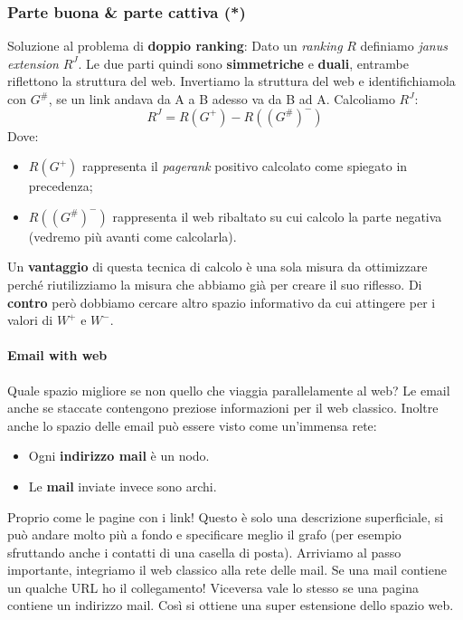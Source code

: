 			\subsubsection{Parte buona \& parte cattiva (*)}
				Soluzione al problema di \textbf{doppio ranking}:
				Dato un \emph{ranking} $R$ definiamo \emph{janus extension} $R^J$. Le due parti quindi sono \textbf{simmetriche} e \textbf{duali}, entrambe riflettono la struttura del web. Invertiamo la struttura del web e identifichiamola con $G^\#$, se un link andava da A a B adesso va da B ad A.
				Calcoliamo $R^J$:
				\[
					R^J = R(G^+) - R((G^\#)^-)
				\]
				Dove:
				\begin{itemize}
					\item $R(G^+)$ rappresenta il \emph{pagerank} positivo calcolato come spiegato in precedenza;
					\item $R((G^\#)^-)$ rappresenta il web ribaltato su cui calcolo la parte negativa (vedremo più avanti come calcolarla).
				\end{itemize}
				Un \textbf{vantaggio} di questa tecnica di calcolo è una sola misura da ottimizzare perché riutilizziamo la misura che abbiamo già per creare il suo riflesso. Di \textbf{contro} però dobbiamo cercare altro spazio informativo da cui attingere per i valori di $W^+$ e $W^-$.
			
				\paragraph{Email with web}
					Quale spazio migliore se non quello che viaggia parallelamente al web? Le email anche se staccate contengono preziose informazioni per il web classico. Inoltre anche lo spazio delle email può essere visto come un'immensa rete:
					\begin{itemize}
						\item Ogni \textbf{indirizzo mail} è un nodo.
						\item Le \textbf{mail} inviate invece sono archi.
					\end{itemize}
					Proprio come le pagine con i link! Questo è solo una descrizione superficiale, si può andare molto più a fondo e specificare meglio il grafo (per esempio sfruttando anche i contatti di una casella di posta).
					Arriviamo al passo importante, integriamo il web classico alla rete delle mail. Se una mail contiene un qualche URL ho il collegamento! Viceversa vale lo stesso se una pagina contiene un indirizzo mail. Così si ottiene una super estensione dello spazio web.
					
